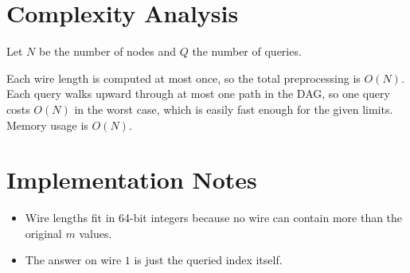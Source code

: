 \documentclass[11pt]{article}
\begin{document}
\section*{Complexity Analysis}

Let $N$ be the number of nodes and $Q$ the number of queries.

Each wire length is computed at most once, so the total preprocessing is $O(N)$. Each query walks upward
through at most one path in the DAG, so one query costs $O(N)$ in the worst case, which is easily fast
enough for the given limits. Memory usage is $O(N)$.

\section*{Implementation Notes}

\begin{itemize}[leftmargin=*]
    \item Wire lengths fit in 64-bit integers because no wire can contain more than the original $m$
    values.
    \item The answer on wire $1$ is just the queried index itself.
\end{itemize}
\end{document}
